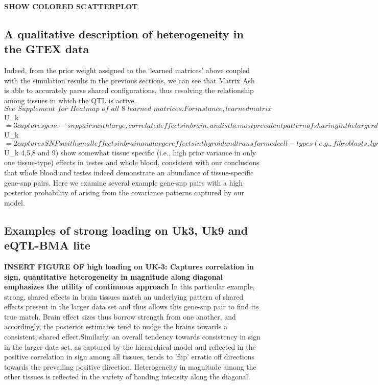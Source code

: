 \textbf{SHOW COLORED SCATTERPLOT}

\subsection{ A qualitative description of heterogeneity in the GTEX data}
 
Indeed, from the prior weight assigned to the `learned matrices' above coupled with the simulation results in the previous sections, we can see that Matrix Ash is able to accurately parse shared configurations, thus resolving the relationship among tissues in which the QTL is active. $\textit{See Supplement for Heatmap of all 8 learned matrices}.  For instance, learned matrix $U_{k}$ = 3 captures gene-snp pairs with large, correlated effects in brain, and is the most prevalent pattern of sharing in the larger data set, as reflected by it's prior weight summed across effect size (see pi barplot). Matrix $U_{k}$ = 2 captures SNPs with small effects in brain and larger effects in thyroid and transformed cell-types (e.g., fibroblasts, lymphocytes). Several of the lower rank matrices whose patterns receive high prior weighting (e.g., $U_{k} 4,5,8 and 9) show somewhat tissue specific (i.e., high prior variance in only one tissue-type) effects in testes and whole blood, consistent with our conclusions that whole blood and testes indeed demonstrate an abundance of tissue-specific gene-snp pairs. Here we examine several example gene-snp pairs with a high posterior probability of arising from the covariance patterns captured by our model. 


\subsection{Examples of strong loading on Uk3, Uk9 and eQTL-BMA lite}


\textbf{INSERT FIGURE OF high loading on UK-3: Captures correlation in sign, quantitative heterogeneity in magnitude along diagonal emphasizes the utility of continuous approach}
In this particular example, strong, shared effects in brain tissues match an underlying pattern of shared effects present in the larger data set and thus allows this gene-snp pair to find its true match. Brain effect sizes thus borrow strength from one another, and accordingly, the posterior estimates tend to nudge the brains towards a consistent, shared effect.Similarly, an overall tendency towards consistency in sign in the larger data set, as captured by the hierarchical model and reflected in the positive correlation in sign among all tissues, tends to 'flip' erratic off directions towards the prevailing positive direction. Heterogeneity in magnitude among the other tissues is reflected in the variety of banding intensity along the diagonal.

